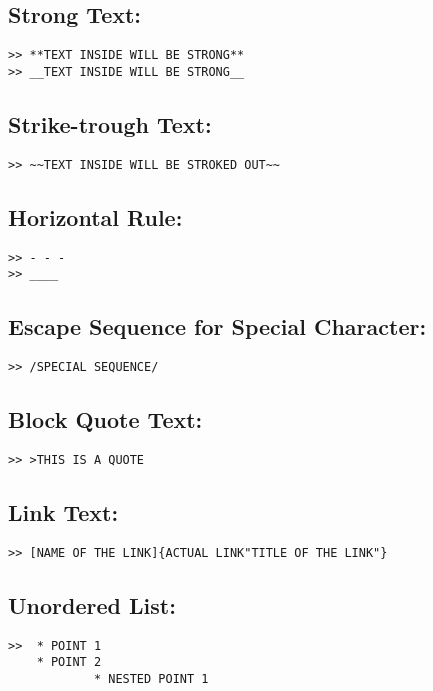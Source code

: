 \documentclass[british]{article}
\begin{document}
\subsection{Strong Text:}
\begin{verbatim}
>> **TEXT INSIDE WILL BE STRONG**
>> __TEXT INSIDE WILL BE STRONG__
\end{verbatim}

\subsection{Strike-trough Text:}
\begin{verbatim}
>> ~~TEXT INSIDE WILL BE STROKED OUT~~
\end{verbatim}

\subsection{Horizontal Rule:}
\begin{verbatim}
>> - - -
>> ____
\end{verbatim}

\subsection{Escape Sequence for Special Character:}
\begin{verbatim}
>> /SPECIAL SEQUENCE/
\end{verbatim}

\subsection{Block Quote Text:}
\begin{verbatim}
>> >THIS IS A QUOTE
\end{verbatim}

\subsection{Link Text:}
\begin{verbatim}
>> [NAME OF THE LINK]{ACTUAL LINK"TITLE OF THE LINK"}
\end{verbatim}

\subsection{Unordered List:}
\begin{verbatim}
>>  * POINT 1
	* POINT 2
			* NESTED POINT 1
\end{verbatim}
\end{document}
